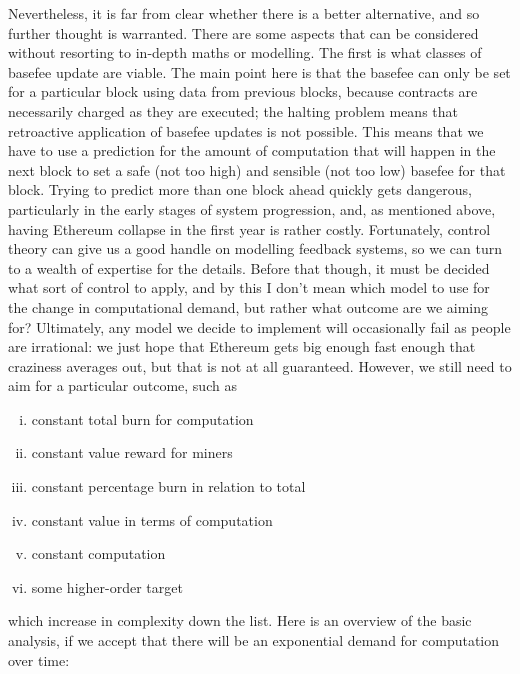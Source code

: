 \documentclass[11pt,a4paper]{article}
\begin{document}
Nevertheless, it is far from clear whether there is a better alternative, and so further thought is warranted. There are some aspects that can be considered without resorting to in-depth maths or modelling. The first is what classes of basefee update are viable. The main point here is that the basefee can only be set for a particular block using data from previous blocks, because contracts are necessarily charged as they are executed; the halting problem means that retroactive application of basefee updates is not possible. This means that we have to use a prediction for the amount of computation that will happen in the next block to set a safe (not too high) and sensible (not too low) basefee for that block. Trying to predict more than one block ahead quickly gets dangerous, particularly in the early stages of system progression, and, as mentioned above, having Ethereum collapse in the first year is rather costly. Fortunately, control theory can give us a good handle on modelling feedback systems, so we can turn to a wealth of expertise for the details. Before that though, it must be decided what sort of control to apply, and by this I don't mean which model to use for the change in computational demand, but rather what outcome are we aiming for? Ultimately, any model we decide to implement will occasionally fail as people are irrational: we just hope that Ethereum gets big enough fast enough that craziness averages out, but that is not at all guaranteed. However, we still need to aim for a particular outcome, such as
\begin{enumerate}[i)] \itemsep=0pt
\item constant total \ether burn for computation
\item constant value reward for miners 
\item constant percentage \ether burn in relation to total \ether
\item constant \ether value in terms of computation
\item constant computation
\item some higher-order target
\end{enumerate}
which increase in complexity down the list. Here is an overview of the basic analysis, if we accept that there will be an exponential demand for computation over time:
\end{document}
